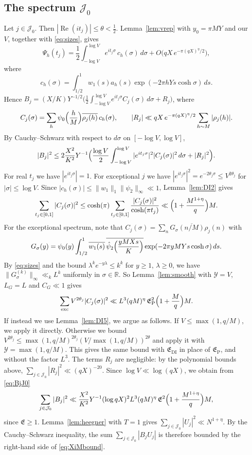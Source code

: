\documentclass[11pt]{amsart}
\theoremstyle{remark}
\theoremstyle{definition}
\numberwithin{equation}{section}
\newcommand{\Jc}{\mathcal{J}}
\newcommand{\R}{\mathbb{R}}
\newcommand{\exc}{\mathrm{exc}}
\begin{document}
\subsection{\texorpdfstring{The spectrum $\Jc_0$}{The spectrum J\_0}}\label{sec:J0}
Let $j\in\Jc_0$. Then $|\operatorname{Re}(it_j)|\le\theta<\frac12$. Lemma~\ref{lem:vrep} with $y_0=\pi MY$ and our $V$, together with \eqref{eq:sizes}, gives
\[
\Psi_h(t_j)=\frac12\int_{-\log V}^{\log V}e^{it_j\sigma}\,c_h(\sigma)\,d\sigma+O\bigl(qX\,e^{-\pi(qX)^\eta/2}\bigr),
\]
where
\[
c_h(\sigma)=\int_{1/2}^1w_1(s)a_h(s)\exp(-2\pi hYs\cosh\sigma)\,ds.
\]
Hence $B_j=(X/K)Y^{-1/2}\bigl(\frac12\int_{-\log V}^{\log V}e^{it_j\sigma}C_j(\sigma)\,d\sigma+R_j\bigr)$, where
\[
C_j(\sigma)=\sum_{h}\psi_0\Bigl(\frac hM\Bigr)\overline{\rho_j(h)}\,c_h(\sigma),\qquad|R_j|\ll qX\,e^{-\pi(qX)^\eta/2}\sum_{h\sim M}|\rho_j(h)|.
\]
By Cauchy--Schwarz with respect to $d\sigma$ on $[-\log V,\log V]$,
\begin{equation}\label{eq:BjJ0}
|B_j|^2\le2\frac{X^2}{K^2}Y^{-1}\Bigl(\frac{\log V}2\int_{-\log V}^{\log V}|e^{it_j\sigma}|^2|C_j(\sigma)|^2\,d\sigma+|R_j|^2\Bigr).
\end{equation}
For real $t_j$ we have $|e^{it_j\sigma}|=1$. For exceptional $j$ we have $|e^{it_j\sigma}|^2=e^{-2\theta_j\sigma}\le V^{2\theta_j}$ for $|\sigma|\le\log V$. Since $|c_h(\sigma)|\le\|w_1\|_1\|\hat\psi_2\|_\infty\ll1$, Lemma~\ref{lem:DI2} gives
\[
\sum_{t_j\in[0,1]}|C_j(\sigma)|^2\le\cosh(\pi)\sum_{t_j\in[0,1]}\frac{|C_j(\sigma)|^2}{\cosh(\pi t_j)}\ll\Bigl(1+\frac{M^{1+\eta}}q\Bigr)M.
\]
For the exceptional spectrum, note that $C_j(\sigma)=\overline{\sum_nG_\sigma(n/M)\rho_j(n)}$ with
\[
G_\sigma(y)=\psi_0(y)\int_{1/2}^1\overline{w_1(s)}\,\overline{\hat\psi_2\Bigl(\frac{yMXs}K\Bigr)}\exp(-2\pi yMYs\cosh\sigma)\,ds.
\]
By \eqref{eq:sizes} and the bound $\lambda^ke^{-y\lambda}\le k^k$ for $y\ge1$, $\lambda\ge0$, we have $\|G_\sigma^{(k)}\|_\infty\ll_kL^k$ uniformly in $\sigma\in\R$. So Lemma~\ref{lem:smooth} with $\mathcal Y=V$, $L_G=L$ and $C_G\ll1$ gives
\[
\sum_{\exc}V^{2\theta_j}|C_j(\sigma)|^2\ll L^{3}(qM)^\eta\,\mathfrak E_{\mathrm P}^2\Bigl(1+\frac Mq\Bigr)M.
\]
If instead we use Lemma~\ref{lem:DI5}, we argue as follows. If $V\le\max(1,q/M)$, we apply it directly. Otherwise we bound $V^{2\theta_j}\le\max(1,q/M)^{2\theta_j}(V/\max(1,q/M))^{2\theta}$ and apply it with $\mathcal Y=\max(1,q/M)$. This gives the same bound with $\mathfrak E_{\mathrm{DI}}$ in place of $\mathfrak E_{\mathrm P}$, and without the factor $L^3$. The terms $R_j$ are negligible: by the polynomial bounds above, $\sum_{j\in\Jc_0}|R_j|^2\ll(qX)^{-20}$. Since $\log V\ll\log(qX)$, we obtain from \eqref{eq:BjJ0}
\[
\sum_{j\in\Jc_0}|B_j|^2\ll\frac{X^2}{K^2}Y^{-1}(\log qX)^2L^3(qM)^{\eta}\,\mathfrak E^2\Bigl(1+\frac{M^{1+\eta}}q\Bigr)M,
\]
since $\mathfrak E\ge1$. Lemma~\ref{lem:heegner} with $T=1$ gives $\sum_{j\in\Jc_0}|U_j|^2\ll N^{1+\eta}$. By the Cauchy--Schwarz inequality, the sum $\sum_{j\in\Jc_0}|B_jU_j|$ is therefore bounded by the right-hand side of \eqref{eq:XiMbound}.
\end{document}
